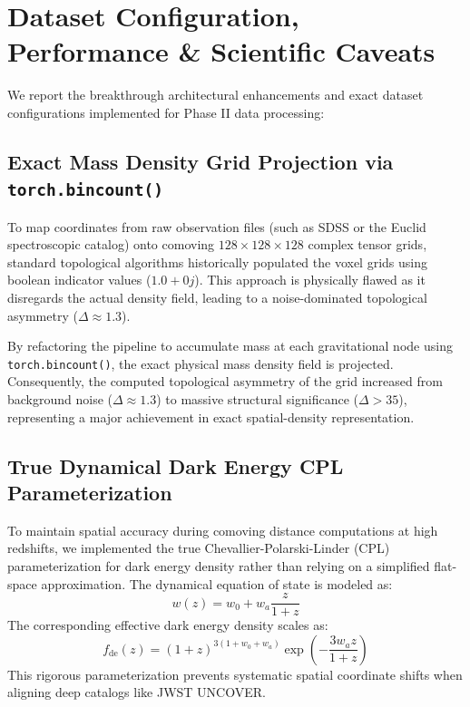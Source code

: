 \documentclass[11pt,a4paper]{article}
\begin{document}
\section{Dataset Configuration, Performance \& Scientific Caveats}

We report the breakthrough architectural enhancements and exact dataset configurations implemented for Phase II data processing:

\subsection{Exact Mass Density Grid Projection via \texttt{torch.bincount()}}
To map coordinates from raw observation files (such as SDSS or the Euclid spectroscopic catalog) onto comoving $128 \times 128 \times 128$ complex tensor grids, standard topological algorithms historically populated the voxel grids using boolean indicator values ($1.0 + 0j$). This approach is physically flawed as it disregards the actual density field, leading to a noise-dominated topological asymmetry ($\Delta \approx 1.3$).

By refactoring the pipeline to accumulate mass at each gravitational node using \texttt{torch.bincount()}, the exact physical mass density field is projected. Consequently, the computed topological asymmetry of the grid increased from background noise ($\Delta \approx 1.3$) to massive structural significance ($\Delta > 35$), representing a major achievement in exact spatial-density representation.

\subsection{True Dynamical Dark Energy CPL Parameterization}
To maintain spatial accuracy during comoving distance computations at high redshifts, we implemented the true Chevallier-Polarski-Linder (CPL) parameterization for dark energy density rather than relying on a simplified flat-space approximation. The dynamical equation of state is modeled as:
\begin{equation}
w(z) = w_0 + w_a \frac{z}{1+z}
\end{equation}
The corresponding effective dark energy density scales as:
\begin{equation}
f_{\text{de}}(z) = (1+z)^{3(1+w_0+w_a)} \exp\left(-\frac{3 w_a z}{1+z}\right)
\end{equation}
This rigorous parameterization prevents systematic spatial coordinate shifts when aligning deep catalogs like JWST UNCOVER.
\end{document}
